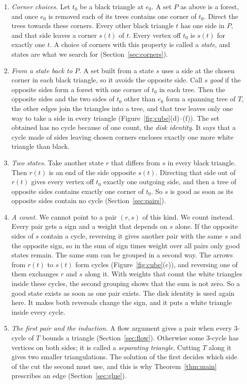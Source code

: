 \documentclass[10pt]{amsart}
\numberwithin{equation}{section}
\theoremstyle{definition}
\theoremstyle{remark}
\newcommand{\T}{T}
\begin{document}
\begin{enumerate}
\item \emph{Corner choices.}
Let $t_0$ be a black triangle at $e_0$.
A set $P$ as above is a forest, and once $e_0$ is removed each of its trees contains one corner of $t_0$.
Direct the trees towards these corners.
Every other black triangle $t$ has one side in $P$, and that side leaves a corner $s(t)$ of $t$.
Every vertex off $t_0$ is $s(t)$ for exactly one $t$.
A choice of corners with this property is called a \emph{state}, and states are what we search for (Section~\ref{sec:corners}).
\item \emph{From a state back to $P$.}
A set built from a state $s$ uses a side at the chosen corner in each black triangle, so it avoids the opposite side.
Call $s$ \emph{good} if the opposite sides form a forest with one corner of $t_0$ in each tree.
Then the opposite sides and the two sides of $t_0$ other than $e_0$ form a spanning tree of $\T$, the other edges join the triangles into a tree, and that tree leaves only one way to take a side in every triangle (Figure~\ref{fig:cube}(d)--(f)).
The set obtained has no cycle because of one count, the \emph{disk identity}.
It says that a cycle made of sides leaving chosen corners encloses exactly one more white triangle than black.
\item \emph{Two states.}
Take another state $r$ that differs from $s$ in every black triangle.
Then $r(t)$ is an end of the side opposite $s(t)$.
Directing that side out of $r(t)$ gives every vertex off $t_0$ exactly one outgoing side, and then a tree of opposite sides contains exactly one corner of $t_0$.
So $s$ is good as soon as its opposite sides contain no cycle (Section~\ref{sec:pairs}).
\item \emph{A count.}
We cannot point to a pair $(r,s)$ of this kind.
We count instead.
Every pair gets a sign and a weight that depends on $s$ alone.
If the opposite sides of $s$ contain a cycle, reversing it gives another pair with the same $s$ and the opposite sign, so in the sum of sign times weight over all pairs only good states remain.
The same sum can be grouped in a second way.
The arrows from $r(t)$ to $s(t)$ form cycles (Figure~\ref{fig:cube}(c)), and reversing one of them exchanges $r$ and $s$ along it.
With weights that count the white triangles inside these cycles, the second grouping shows that the sum is not zero.
So a good state exists as soon as one pair exists.
The disk identity is used again here.
It makes both reversals change the sign, and it puts a white triangle inside every cycle.
\item \emph{The first pair and the induction.}
A flow argument gives a pair when every $3$-cycle of $\T$ bounds a triangle (Section~\ref{sec:flow}).
Otherwise some $3$-cycle has vertices on both sides; it is called a \emph{separating triangle}.
Cutting $\T$ along it gives two smaller triangulations.
The solution of the first decides which side of the cut the second must use, and this is why Theorem~\ref{thm:main} prescribes an edge (Section~\ref{sec:glue}).
\end{enumerate}
\end{document}
